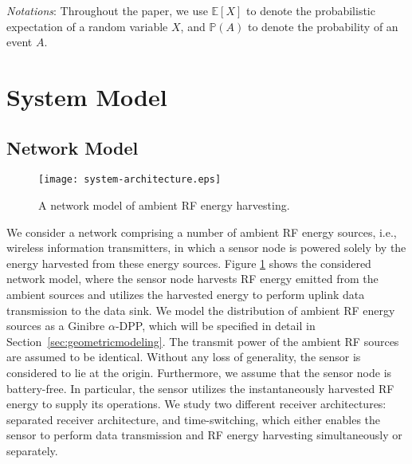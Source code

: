 \documentclass[12pt,draftclsnofoot,onecolumn]{IEEEtran}
\begin{document}
{\em Notations}: Throughout the paper, we use $\mathbb{E}[X]$ to denote the probabilistic expectation of a random variable $X$, and $\mathbb{P}(A)$ to denote the probability of an event $A$. 


\section{System Model}
\label{sec:systemmodel}





\subsection{Network Model}
\label{sec:network_model}

\begin{figure}
\centering
\texttt{[image: system-architecture.eps]}
\caption{A network model of ambient RF energy harvesting.} \label{fig:systemmodel}
\end{figure}






We consider a network comprising a number of ambient RF energy sources, i.e., wireless information transmitters, in which a sensor node is powered solely by the energy harvested from these energy sources. Figure \ref{fig:systemmodel} shows the considered network model, where the sensor node harvests RF energy emitted from the ambient sources and utilizes the harvested energy to perform  uplink data transmission to the data sink.
We model the distribution of ambient RF energy sources as a Ginibre $\alpha$-DPP, which will be specified in detail in Section~\ref{sec:geometricmodeling}. The transmit power of the ambient RF sources are assumed to be identical. Without any loss of generality, the sensor is considered to lie at the origin. Furthermore, we assume that the sensor node is battery-free. In particular, the sensor utilizes the instantaneously harvested RF energy to supply its operations. 
We study two different receiver architectures: separated receiver architecture, and time-switching, which either enables the sensor to perform data transmission and RF energy harvesting simultaneously or separately. 
\end{document}
